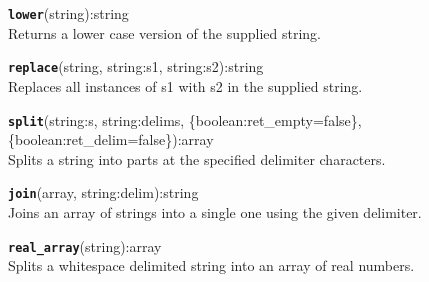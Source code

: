 \texttt{{\large\textbf{lower}}}\textsf{(string):string}\\
 Returns a lower case version of the supplied string.

\hrulefill

\texttt{{\large\textbf{replace}}}\textsf{(string, string:s1, string:s2):string}\\
 Replaces all instances of s1 with s2 in the supplied string.

\hrulefill

\texttt{{\large\textbf{split}}}\textsf{(string:s, string:delims, \{boolean:ret\_empty=false\}, \{boolean:ret\_delim=false\}):array}\\
 Splits a string into parts at the specified delimiter characters.

\hrulefill

\texttt{{\large\textbf{join}}}\textsf{(array, string:delim):string}\\
 Joins an array of strings into a single one using the given delimiter.

\hrulefill

\texttt{{\large\textbf{real\_array}}}\textsf{(string):array}\\
 Splits a whitespace delimited string into an array of real numbers.
